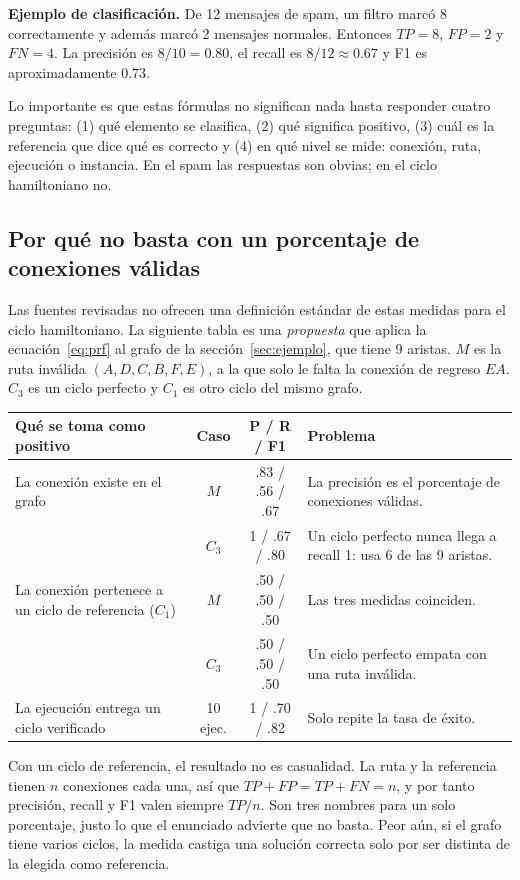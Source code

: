 \documentclass[letterpaper,12pt]{report}
\begin{document}
\textbf{Ejemplo de clasificación.} De 12 mensajes de spam, un filtro marcó 8 correctamente y además marcó 2 mensajes normales. Entonces $TP=8$, $FP=2$ y $FN=4$. La precisión es $8/10=0.80$, el recall es $8/12\approx 0.67$ y F1 es aproximadamente $0.73$.

Lo importante es que estas fórmulas no significan nada hasta responder cuatro preguntas: (1) qué elemento se clasifica, (2) qué significa positivo, (3) cuál es la referencia que dice qué es correcto y (4) en qué nivel se mide: conexión, ruta, ejecución o instancia. En el spam las respuestas son obvias; en el ciclo hamiltoniano no.

\subsection{Por qué no basta con un porcentaje de conexiones válidas}
Las fuentes revisadas no ofrecen una definición estándar de estas medidas para el ciclo hamiltoniano. La siguiente tabla es una \emph{propuesta} que aplica la ecuación~\eqref{eq:prf} al grafo de la sección~\ref{sec:ejemplo}, que tiene 9 aristas. $M$ es la ruta inválida $(A,D,C,B,F,E)$, a la que solo le falta la conexión de regreso $EA$. $C_3$ es un ciclo perfecto y $C_1$ es otro ciclo del mismo grafo.

\begin{center}
\small
\begin{tabular}{@{}P{4.9cm}ccP{6.5cm}@{}}
\toprule
\textbf{Qué se toma como positivo} & \textbf{Caso} & \textbf{P / R / F1} & \textbf{Problema}\\
\midrule
La conexión existe en el grafo & $M$ & .83 / .56 / .67 & La precisión es el porcentaje de conexiones válidas.\\
 & $C_3$ & 1 / .67 / .80 & Un ciclo perfecto nunca llega a recall 1: usa 6 de las 9 aristas.\\
\addlinespace
La conexión pertenece a un ciclo de referencia ($C_1$) & $M$ & .50 / .50 / .50 & Las tres medidas coinciden.\\
 & $C_3$ & .50 / .50 / .50 & Un ciclo perfecto empata con una ruta inválida.\\
\addlinespace
La ejecución entrega un ciclo verificado & 10 ejec. & 1 / .70 / .82 & Solo repite la tasa de éxito.\\
\bottomrule
\end{tabular}
\end{center}

Con un ciclo de referencia, el resultado no es casualidad. La ruta y la referencia tienen $n$ conexiones cada una, así que $TP+FP=TP+FN=n$, y por tanto precisión, recall y F1 valen siempre $TP/n$. Son tres nombres para un solo porcentaje, justo lo que el enunciado advierte que no basta. Peor aún, si el grafo tiene varios ciclos, la medida castiga una solución correcta solo por ser distinta de la elegida como referencia.
\end{document}
